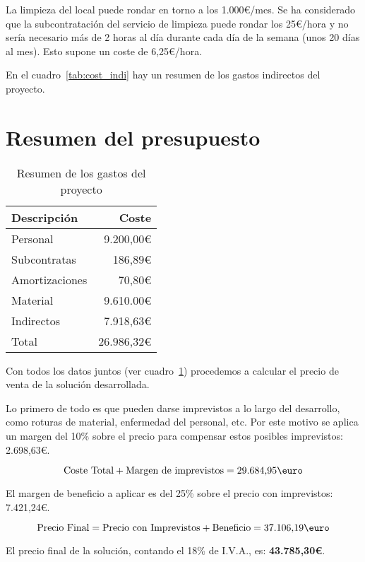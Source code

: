 La limpieza del local puede rondar en torno a los 1.000\euro/mes. Se ha considerado que la subcontratación del servicio de limpieza puede rondar los 25\euro/hora y no sería necesario más de 2 horas al día durante cada día de la semana (unos 20 días al mes). Esto supone un coste de 6,25\euro/hora.

En el cuadro~\ref{tab:cost_indi} hay un resumen de los gastos indirectos del proyecto.

\section{Resumen del presupuesto}

\begin{table}
	\centering
	
	\begin{tabular}{|l|r|}
		\hline
		Descripción  & Coste  \\
		\hline
		Personal     & 9.200,00\euro \\
		\hline
		Subcontratas & 186,89\euro \\
		\hline
		Amortizaciones & 70,80\euro\\
		\hline
		Material     & 9.610.00\euro\\
		\hline
		Indirectos   & 7.918,63\euro\\
		\hline
		\hline
		Total        & 26.986,32\euro\\
		\hline
	\end{tabular}
	\caption{Resumen de los gastos del proyecto}\label{tab:resu_gastos}
\end{table}

Con todos los datos juntos (ver cuadro~\ref{tab:resu_gastos}) procedemos a calcular el precio de venta de la solución desarrollada.

Lo primero de todo es que pueden darse imprevistos a lo largo del desarrollo, como roturas de material, enfermedad del personal, etc. Por este motivo se aplica un margen del 10\% sobre el precio para compensar estos posibles imprevistos: 2.698,63\euro.

$$
\mbox{Coste Total} + \mbox{Margen de imprevistos} = \mbox{29.684,95\euro}
$$

El margen de beneficio a aplicar es del 25\% sobre el precio con imprevistos: 7.421,24\euro.

$$
	\mbox{Precio Final} = \mbox{Precio con Imprevistos} + \mbox{Beneficio} = \mbox{37.106,19\euro}
$$

El precio final de la solución, contando el 18\% de I.V.A., es: {\large \textbf{43.785,30\euro}}.